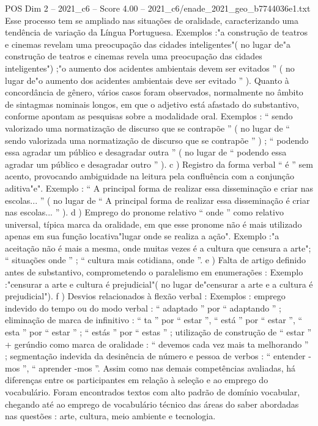 \begin{textsample}{POS Dim 2 – 2021\_c6 – Score 4.00 – 2021\_c6/enade\_2021\_geo\_b7744036e1.txt}
Esse processo tem se ampliado nas situações de oralidade, caracterizando uma tendência de variação da Língua Portuguesa.
Exemplos :"a construção de teatros e cinemas revelam uma preocupação das cidades inteligentes"( no lugar de"a construção de teatros e cinemas revela uma preocupação das cidades inteligentes") ;"o aumento dos acidentes ambientais devem ser evitados ” ( no lugar de"o aumento dos acidentes ambientais deve ser evitado ” ).
Quanto à concordância de gênero, vários casos foram observados, normalmente no âmbito de sintagmas nominais longos, em que o adjetivo está afastado do substantivo, conforme apontam as pesquisas sobre a modalidade oral.
Exemplos : “ sendo valorizado uma normatização de discurso que se contrapõe ” ( no lugar de “ sendo valorizada uma normatização de discurso que se contrapõe ” ) ; “ podendo essa agradar um público e desagradar outra ” ( no lugar de “ podendo essa agradar um público e desagradar outro ” ). c ) Registro da forma verbal “ é ” sem acento, provocando ambiguidade na leitura pela confluência com a conjunção aditiva"e".
Exemplo : “ A principal forma de realizar essa disseminação e criar nas escolas... ” ( no lugar de “ A principal forma de realizar essa disseminação é criar nas escolas... ” ). d ) Emprego do pronome relativo “ onde ” como relativo universal, típica marca da oralidade, em que esse pronome não é mais utilizado apenas em sua função locativa"lugar onde se realiza a ação".
Exemplo :"a aceitação não é mais a mesma, onde muitas vezes é a cultura que censura a arte"; “ situações onde ” ; “ cultura mais cotidiana, onde ”. e ) Falta de artigo definido antes de substantivo, comprometendo o paralelismo em enumerações : Exemplo :"censurar a arte e cultura é prejudicial"( no lugar de"censurar a arte e a cultura é prejudicial"). f ) Desvios relacionados à flexão verbal : Exemplos : emprego indevido do tempo ou do modo verbal : “ adaptado ” por “ adaptando ” ; eliminação de marca de infinitivo : “ ta ” por “ estar ”, “ está ” por “ estar ”, “ esta ” por “ estar ” ; “ estás ” por “ estas ” ; utilização de construção de “ estar ” + gerúndio como marca de oralidade : “ devemos cada vez mais ta melhorando ” ; segmentação indevida da desinência de número e pessoa de verbos : “ entender -mos ”, “ aprender -mos ”.
Assim como nas demais competências avaliadas, há diferenças entre os participantes em relação à seleção e ao emprego do vocabulário.
Foram encontrados textos com alto padrão de domínio vocabular, chegando até ao emprego de vocabulário técnico das áreas do saber abordadas nas questões : arte, cultura, meio ambiente e tecnologia.

\end{textsample}
